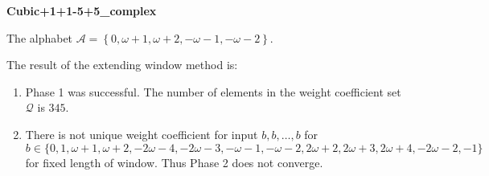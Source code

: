 \begin{exmp}
\textbf{ Cubic+1+1-5+5\_complex }

\label{ex:Cubic+1+1-5+5complex}

The alphabet $\mathcal{A} =\left\{0, \omega + 1, \omega + 2, -\omega - 1, -\omega - 2\right\}$.

The result of the extending window method is:
\begin{enumerate}
    \item Phase 1 was successful.
The number of elements in the weight coefficient set $\mathcal{Q}$ is $345$.

    \item There is not unique weight coefficient for input $b,b,\dots,b$ for $b\in\{0, 1, \omega + 1, \omega + 2, -2\omega - 4, -2\omega - 3, -\omega - 1, -\omega - 2, 2\omega + 2, 2\omega + 3, 2\omega + 4, -2\omega - 2, -1\}$ for fixed length of window. Thus Phase 2 does not converge.

\end{enumerate}
\end{exmp}
